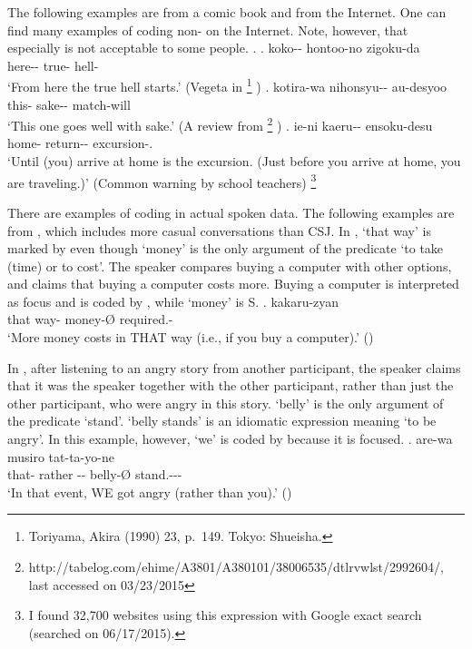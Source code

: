 The following examples are from a comic book and from the Internet.
One can find many examples of  coding non- on the Internet.
Note, however, that
especially \Next[b] is not acceptable to some people.
%
\ex.
 \ag. koko-- hontoo-no zigoku-da \\
      here-- true- hell- \\
      `From here the true hell starts.'
      \hfill{(Vegeta in %
      \footnote{
      Toriyama, Akira (1990)  23, p.~149. Tokyo: Shueisha.
      }
      )}
 \bg. kotira-wa nihonsyu-- au-desyoo \\
      this- sake-- match-will \\
      `This one goes well with sake.'
      \hfill{(A review from %
       \footnote{http://tabelog.com/ehime/A3801/A380101/38006535/dtlrvwlst/2992604/, last accessed on 03/23/2015}
      )}
  \bg. ie-ni kaeru-- ensoku-desu \\
       home- return-- excursion-. \\
       `Until (you) arrive at home is the excursion. (Just before you arrive at home, you are traveling.)'
       \hfill{(Common warning by school teachers)}%
       \footnote{
       I found 32,700 websites using this expression with Google exact search (searched on 06/17/2015).
       }


There are examples of  coding 
in actual spoken data.
The following examples are from  \cite{Den_2007_SAC},
which includes more casual conversations than CSJ.
In \Next,
 `that way' is marked by  even though  `money' is the only argument of the  predicate  `to take (time) or to cost'.
The speaker compares buying a computer with other options,
and claims that buying a computer costs more.
Buying a computer is interpreted as focus and is coded by ,
while `money' is S.
%
\exg.    kakaru-zyan \\
	that way- money-{\O} required.- \\
	`More money costs in THAT way (i.e., if you buy a computer).' \hfill{()}

In \Next, after listening to an angry story from another participant, the speaker claims that it was the speaker together with the other participant, rather than just the other participant, who were angry in this story.
 `belly' is the only argument of the  predicate  `stand'.
 `belly stands' is an idiomatic expression meaning `to be angry'.
In this example,
however,
 `we' is coded by 
because it is focused.
\exg. are-wa musiro   tat-ta-yo-ne \\
	that- rather -- belly-{\O} stand.--- \\
	`In that event, WE got angry (rather than you).' \hfill{()}


